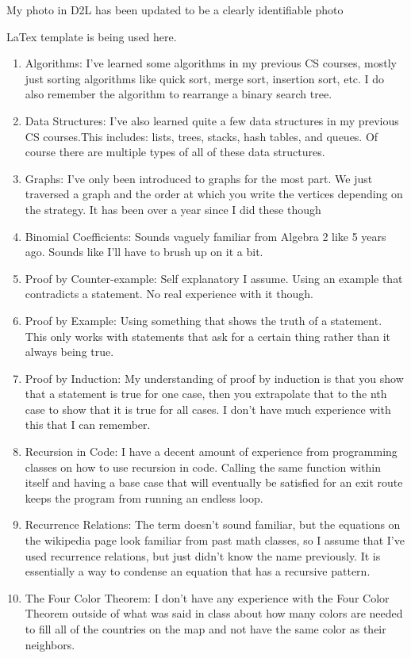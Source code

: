 \documentclass{article}
\author{Spencer Lawry}
\begin{document}
My photo in D2L has been updated to be a clearly identifiable photo

\clearpage
\header
LaTex template is being used here.

\clearpage
\header
\begin{enumerate}
\item Algorithms: I've learned some algorithms in my previous CS courses, mostly just sorting algorithms like quick sort, merge sort, insertion sort, etc. I do also remember the algorithm to rearrange a binary search tree.                                  
\item Data Structures: I've also learned quite a few data structures in my previous CS courses.This includes: lists, trees, stacks, hash tables, and queues. Of course there are multiple types of all of these data structures.                                                
\item Graphs: I've only been introduced to graphs for the most part. We just traversed a graph and the order at which you write the vertices depending on the strategy. It has been over a year since I did these though
\item Binomial Coefficients: Sounds vaguely familiar from Algebra 2 like 5 years ago. Sounds like I'll have to brush up on it a bit.
\item Proof by Counter-example: Self explanatory I assume. Using an example that contradicts a statement. No real experience with it though.
\item Proof by Example: Using something that shows the truth of a statement. This only works with statements that ask for a certain thing rather than it always being true.
\item Proof by Induction: My understanding of proof by induction is that you show that a statement is true for one case, then you extrapolate that to the nth case to show that it is true for all cases. I don't have much experience with this that I can remember.
\item Recursion in Code: I have a decent amount of experience from programming classes on how to use recursion in code. Calling the same function within itself and having a base case that will eventually be satisfied for an exit route keeps the program from running an endless loop.
\item Recurrence Relations: The term doesn't sound familiar, but the equations on the wikipedia page look familiar from past math classes, so I assume that I've used recurrence relations, but just didn't know the name previously. It is essentially a way to condense an equation that has a recursive pattern.
\item The Four Color Theorem: I don't have any experience with the Four Color Theorem outside of what was said in class about how many colors are needed to fill all of the countries on the map and not have the same color as their neighbors. 

\end{enumerate}
\end{document}
